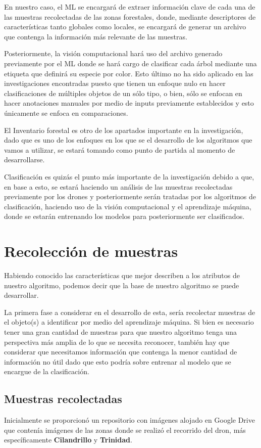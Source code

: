 En nuestro caso, el ML se encargará de extraer información clave de cada una de las muestras recolectadas de las zonas forestales, donde, mediante descriptores de características tanto globales como locales, se encargará de generar un archivo que contenga la información más relevante de las muestras.

Posteriormente, la visión computacional hará uso del archivo generado previamente por el ML donde se hará cargo de clasificar cada árbol mediante una etiqueta que definirá su especie por color. Esto último no ha sido aplicado en las investigaciones encontradas puesto que tienen un enfoque nulo en hacer clasificaciones de múltiples objetos de un sólo tipo, o bien, sólo se enfocan en hacer anotaciones manuales por medio de inputs previamente establecidos y esto únicamente se enfoca en comparaciones.

El Inventario forestal es otro de los apartados importante en la investigación, dado que es uno de los enfoques en los que se el desarrollo de los algoritmos que vamos a utilizar, se estará tomando como punto de partida al momento de desarrollarse. 

Clasificación es quizás el punto más importante de la investigación debido a que, en base a esto, se estará haciendo un análisis de las muestras recolectadas previamente por los drones y posteriormente serán tratadas por los algoritmos de clasificación, haciendo uso de la visión computacional y el aprendizaje máquina, donde se estarán entrenando los modelos para posteriormente ser clasificados.


\chapter{Recolección de muestras}
Habiendo conocido las características que mejor describen a los atributos de nuestro algoritmo, podemos decir que la base de nuestro algoritmo se puede desarrollar.

La primera fase a considerar en el desarrollo de esta, sería recolectar muestras de el objeto(s) a identificar por medio del aprendizaje máquina. Si bien es necesario tener una gran cantidad de muestras para que nuestro algoritmo tenga una perspectiva más amplia de lo que se necesita reconocer, también hay que considerar que necesitamos información que contenga la menor cantidad de información no útil dado que esto podría sobre entrenar al modelo que se encargue de la clasificación.

\section{Muestras recolectadas}
Inicialmente se proporcionó un repositorio con imágenes alojado en Google Drive que contenía imágenes de las zonas donde se realizó el recorrido del dron, más específicamente \textbf{Cilandrillo} y \textbf{Trinidad}.

